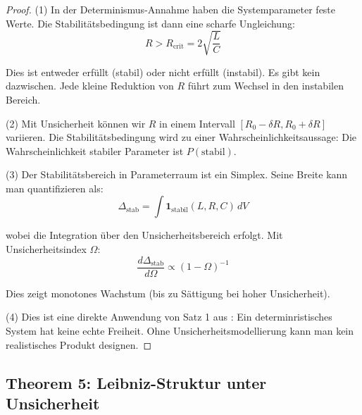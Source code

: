 \documentclass[a4paper,12pt,twoside]{report}
\theoremstyle{definition}
\begin{document}
\begin{proof}

(1) In der Determinismus-Annahme haben die Systemparameter feste Werte. Die Stabilitätsbedingung ist dann eine scharfe Ungleichung:
\begin{equation}
R > R_{\text{crit}} = 2\sqrt{\frac{L}{C}}
\end{equation}

Dies ist entweder erfüllt (stabil) oder nicht erfüllt (instabil). Es gibt kein dazwischen. Jede kleine Reduktion von $R$ führt zum Wechsel in den instabilen Bereich.

(2) Mit Unsicherheit können wir $R$ in einem Intervall $[R_0 - \delta R, R_0 + \delta R]$ variieren. Die Stabilitätsbedingung wird zu einer Wahrscheinlichkeitsaussage: Die Wahrscheinlichkeit stabiler Parameter ist $P(\text{stabil})$.

(3) Der Stabilitätsbereich in Parameterraum ist ein Simplex. Seine Breite kann man quantifizieren als:
\begin{equation}
\Delta_{\text{stab}} = \int \mathbf{1}_{\text{stabil}}(L, R, C) \, dV
\end{equation}

wobei die Integration über den Unsicherheitsbereich erfolgt. Mit Unsicherheitsindex $\Omega$:
\begin{equation}
\frac{d\Delta_{\text{stab}}}{d\Omega} \propto (1-\Omega)^{-1}
\end{equation}

Dies zeigt monotones Wachstum (bis zu Sättigung bei hoher Unsicherheit).

(4) Dies ist eine direkte Anwendung von Satz 1 aus \cite{epp_signal}: Ein determinristisches System hat keine echte Freiheit. Ohne Unsicherheitsmodellierung kann man kein realistisches Produkt designen.

\end{proof}

\subsection*{Theorem 5: Leibniz-Struktur unter Unsicherheit}
\end{document}
